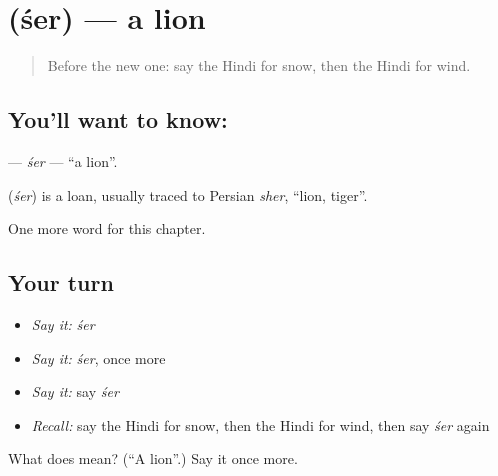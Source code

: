 \section[\texorpdfstring{\hi{शेर} (śer)}{शेर (śer)}]{ (śer) — a lion}

\label{lesson:HI-C145-ser}



\begin{quote}
Before the new one: say the Hindi for snow, then the Hindi for wind.
\end{quote}

\subsection*{You'll want to know: }
\textbf{} — \emph{śer} — \textquotedblleft{}a lion\textquotedblright{}.

\begin{cousinweb}
\textbf{} (\emph{śer}) is a loan, usually traced to Persian \emph{sher}, \textquotedblleft{}lion, tiger\textquotedblright{}.
\end{cousinweb}

\begin{grammarlens}[title={What you've built}]
One more word for this chapter.
\end{grammarlens}

\subsection*{Your turn}
\begin{itemize}
\raggedright
  \item \emph{Say it:} \emph{śer}
  \item \emph{Say it:} \emph{śer}, once more
  \item \emph{Say it:} say \emph{śer}
  \item \emph{Recall:} say the Hindi for snow, then the Hindi for wind, then say \emph{śer} again
\end{itemize}

\begin{tcolorbox}[breakable,colback=teal!4,colframe=teal!35!black,title={Before you move on}]
What does  mean? (\textquotedblleft{}A lion\textquotedblright{}.) Say it once more.
\end{tcolorbox}
